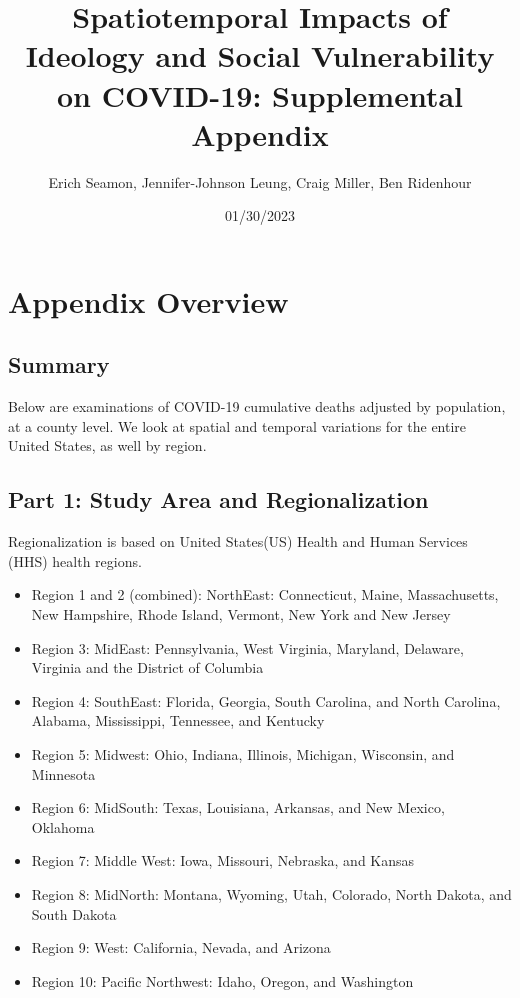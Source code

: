 \documentclass[
]{article}
\title{Spatiotemporal Impacts of Ideology and Social Vulnerability on
COVID-19: Supplemental Appendix}
\author{Erich Seamon, Jennifer-Johnson Leung, Craig Miller, Ben
Ridenhour}
\date{01/30/2023}
\providecommand{\tightlist}{%
  \setlength{\itemsep}{0pt}\setlength{\parskip}{0pt}}
\begin{document}
\maketitle

{
\setcounter{tocdepth}{2}
\tableofcontents
}
\newpage

\hypertarget{appendix-overview}{%
\section{Appendix Overview}\label{appendix-overview}}

\hypertarget{summary}{%
\subsection{Summary}\label{summary}}

Below are examinations of COVID-19 cumulative deaths adjusted by
population, at a county level. We look at spatial and temporal
variations for the entire United States, as well by region.

\hypertarget{part-1-study-area-and-regionalization}{%
\subsection{Part 1: Study Area and
Regionalization}\label{part-1-study-area-and-regionalization}}

Regionalization is based on United States(US) Health and Human Services
(HHS) health regions.

\begin{itemize}
\tightlist
\item
  Region 1 and 2 (combined): NorthEast: Connecticut, Maine,
  Massachusetts, New Hampshire, Rhode Island, Vermont, New York and New
  Jersey
\item
  Region 3: MidEast: Pennsylvania, West Virginia, Maryland, Delaware,
  Virginia and the District of Columbia
\item
  Region 4: SouthEast: Florida, Georgia, South Carolina, and North
  Carolina, Alabama, Mississippi, Tennessee, and Kentucky
\item
  Region 5: Midwest: Ohio, Indiana, Illinois, Michigan, Wisconsin, and
  Minnesota
\item
  Region 6: MidSouth: Texas, Louisiana, Arkansas, and New Mexico,
  Oklahoma
\item
  Region 7: Middle West: Iowa, Missouri, Nebraska, and Kansas
\item
  Region 8: MidNorth: Montana, Wyoming, Utah, Colorado, North Dakota,
  and South Dakota
\item
  Region 9: West: California, Nevada, and Arizona
\item
  Region 10: Pacific Northwest: Idaho, Oregon, and Washington
\end{itemize}
\end{document}
